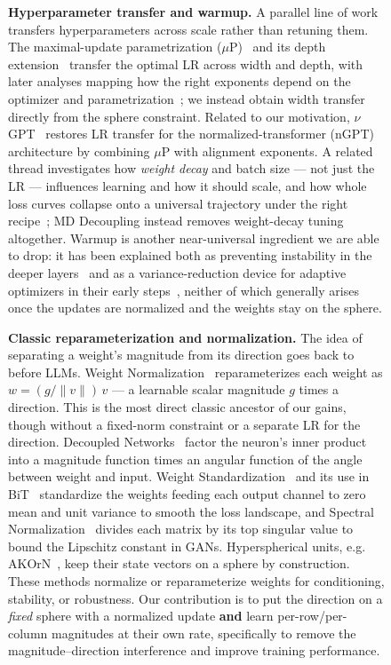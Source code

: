 \documentclass[10pt]{article} %
\begin{document}
\begin{figure}[t]
\textbf{Hyperparameter transfer and warmup.} A parallel line of work transfers hyperparameters across scale rather than retuning them. The maximal-update parametrization ($\mu$P)~\citep{yang2022tensor} and its depth extension~\citep{yang2023tensor} transfer the optimal LR across width and depth, with later analyses mapping how the right exponents depend on the optimizer and parametrization~\citep{everett2024scaling,dey2025completep,mlodozeniec2025completed,ren2026rethinking}; we instead obtain width transfer directly from the sphere constraint. Related to our motivation, $\nu$GPT~\citep{shigida2026learning} restores LR transfer for the normalized-transformer (nGPT) architecture by combining $\mu$P with alignment exponents. A related thread investigates how \emph{weight decay} and batch size --- not just the LR --- influences learning and how it should scale, and how whole loss curves collapse onto a universal trajectory under the right recipe~\citep{andriushchenko2023weight,wang2024adamw,bergsma2025power,bergsma2025collapse}; MD Decoupling instead removes weight-decay tuning altogether. Warmup is another near-universal ingredient we are able to drop: it has been explained both as preventing instability in the deeper layers~\citep{gotmare2019closer} and as a variance-reduction device for adaptive optimizers in their early steps~\citep{goyal2017accurate,liu2020variance,xiong2020layer}, neither of which generally arises once the updates are normalized and the weights stay on the sphere.

\textbf{Classic reparameterization and normalization.} The idea of separating a weight's magnitude from its direction goes back to before LLMs. Weight Normalization~\citep{salimans2016weight} reparameterizes each weight as $w = (g/\lVert v\rVert)\,v$ --- a learnable scalar magnitude $g$ times a direction. This is the most direct classic ancestor of our gains, though without a fixed-norm constraint or a separate LR for the direction. Decoupled Networks~\citep{liu2018decoupled} factor the neuron's inner product into a magnitude function times an angular function of the angle between weight and input. Weight Standardization~\citep{qiao2019micro} and its use in BiT~\citep{kolesnikov2020big} standardize the weights feeding each output channel to zero mean and unit variance to smooth the loss landscape, and Spectral Normalization~\citep{miyato2018spectral} divides each matrix by its top singular value to bound the Lipschitz constant in GANs. Hyperspherical units, e.g. AKOrN~\citep{miyato2025artificial}, keep their state vectors on a sphere by construction. These methods normalize or reparameterize weights for conditioning, stability, or robustness. Our contribution is to put the direction on a \emph{fixed} sphere with a normalized update \textbf{and} learn per-row/per-column magnitudes at their own rate, specifically to remove the magnitude--direction interference and improve training performance.


\end{figure}
\end{document}
